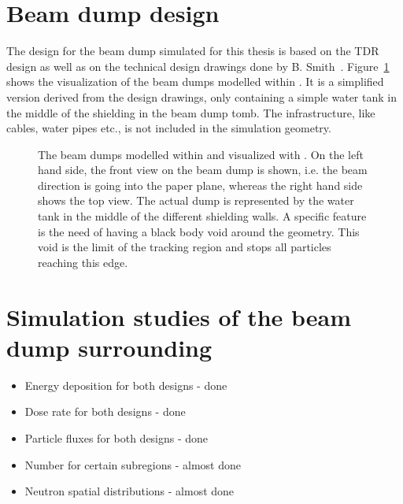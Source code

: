\section{Beam dump design}
\label{BeamDumps:design}
The design for the beam dump simulated for this thesis is based on the TDR design as well as on the technical design drawings done by B. Smith~\cite{Smith_drawings}.
Figure~\ref{fig:BeamDumps:geometry} shows the visualization of the beam dumps modelled within \fluka. It is a simplified version derived from the design drawings, only containing a simple water tank in the middle of the shielding in the beam dump tomb. The infrastructure, like cables, water pipes etc., is not included in the simulation geometry.

\begin{figure}
\begin{center}
\caption[Geometry of the simulated beam dumps.]{The beam dumps modelled within \fluka and visualized with \flair. On the left hand side, the front view on the beam dump is shown, i.e. the beam direction is going into the paper plane, whereas the right hand side shows the top view. The actual dump is represented by the water tank in the middle of the different shielding walls. A \fluka specific feature is the need of having a black body void around the geometry. This void is the limit of the tracking region and stops all particles reaching this edge.}
\label{fig:BeamDumps:geometry}
\end{center}
\end{figure}

\section{Simulation studies of the beam dump surrounding}
\label{BeamDumps:sim_surrounding}

\begin{itemize}
 \item Energy deposition for both designs - done
 \item Dose rate for both designs - done 
 \item Particle fluxes for both designs - done 
 \item Number for certain subregions - almost done
 \item Neutron spatial distributions - almost done
\end{itemize}


